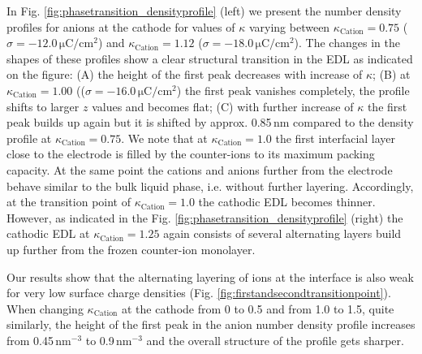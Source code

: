 \documentclass[final,5p,times,twocolumn]{elsarticle}
\begin{document}
In Fig. \ref{fig:phasetransition_densityprofile} (left) we present the number density profiles for anions at the cathode for values of $\kappa$ varying between $\kappa_{\mathrm{Cation}}=0.75$ ($\sigma=-12.0\,\mathrm{\mu C/cm^2}$) and $\kappa_{\mathrm{Cation}}=1.12$ ($\sigma=-18.0\,\mathrm{\mu C/cm^2}$). The changes in the shapes of these profiles show a clear structural transition in the EDL as indicated on the figure: (A) the height of the first peak decreases with increase of $\kappa$; (B) at $\kappa_{\mathrm{Cation}}=1.00$ (($\sigma=-16.0\,\mathrm{\mu C/cm^2}$) the first peak vanishes completely, the profile shifts to larger $z$ values and becomes flat; (C) with further increase of $\kappa$ the first peak builds up again but it is shifted by approx. 0.85\,nm compared to the density profile at $\kappa_{\mathrm{Cation}}=0.75$. We note that at $\kappa_{\mathrm{Cation}}=1.0$ the first interfacial layer close to the electrode is filled by the counter-ions to its maximum packing capacity. At the same point the cations and anions further from the electrode behave similar to the bulk liquid phase, i.e. without further layering. Accordingly, at the transition point of $\kappa_{\mathrm{Cation}}=1.0$  the cathodic EDL becomes thinner. However, as indicated in the Fig. \ref{fig:phasetransition_densityprofile} (right) the cathodic EDL at $\kappa_{\mathrm{Cation}}=1.25$ again consists of several alternating layers build up further from the frozen counter-ion monolayer.

Our results show that the alternating layering of ions at the interface is also weak for very low surface charge densities (Fig. \ref{fig:firstandsecondtransitionpoint}). When changing $\kappa_{\mathrm{Cation}}$ at the cathode from 0 to 0.5 and from 1.0 to 1.5, quite similarly, the height of the first peak in the anion number density profile increases from 0.45\,nm$^{-3}$ to 0.9\,nm$^{-3}$ and the overall structure of the profile gets sharper.
\end{document}
